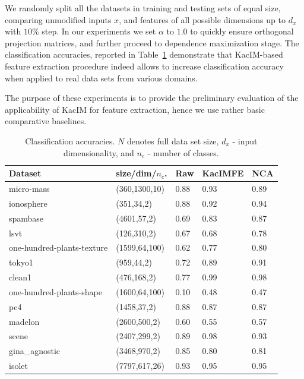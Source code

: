 \documentclass{article}
\begin{document}
We randomly split all the datasets in training and testing sets of equal size, comparing unmodified inputs $x$, and features of all possible dimensions up to $d_{x}$ with $10\%$ step.  In our experiments we set $\alpha$ to $1.0$ to quickly ensure orthogonal projection matrices, and further proceed to dependence maximization stage. 
The classification accuracies, reported in Table~\ref{table:classification_accuracies} demonstrate that KacIM-based feature extraction procedure indeed allows to increase classification accuracy when applied to real data sets from various domains.

The purpose of these experiments is to provide the preliminary evaluation of the applicability of KacIM for feature extraction, hence we use rather basic comparative baselines.


\begin{table}	
	\centering
	\begin{tabular}{ |p{3cm}|p{2.0cm}|p{1.2cm}|p{1.7cm}|p{1.2cm}|  }
		\hline
		Dataset & size/dim/$n_{c}$. & Raw & KacIMFE & NCA  \\
		\hline
		micro-mass  &  (360,1300,10)  &   0.88  &   0.93  &   0.89 \\
		ionosphere  &  (351,34,2)  &   0.88  &   0.92  &   0.94 \\
		spambase  &  (4601,57,2)  &   0.69  &   0.83  &   0.87 \\
		lsvt  &  (126,310,2)  &   0.67  &   0.68  &   0.78 \\		
		one-hundred-plants-texture  &  (1599,64,100)  &   0.62  &   0.77  &   0.80 \\
		tokyo1  &  (959,44,2)  &   0.72  &   0.89  &   0.91 \\				
		clean1  &  (476,168,2)  &   0.77  &   0.99  &   0.98 \\
		one-hundred-plants-shape  &  (1600,64,100)  &   0.10  &   0.48  &   0.47 \\	
		pc4  &  (1458,37,2)  &   0.88  &   0.87  &   0.87 \\
		madelon  &  (2600,500,2)  &   0.60  &   0.55  &   0.57 \\
		scene  &  (2407,299,2)  &   0.89  &   0.98  &   0.93 \\
		gina\_agnostic  &  (3468,970,2)  &   0.85  &   0.80  &   0.81 \\
		isolet  &  (7797,617,26)  &   0.93  &   0.95  &   0.95 \\			
								
		\hline
	\end{tabular}
	\caption{Classification accuracies. $N$ denotes full data set size, $d_{x}$ - input dimensionality, and $n_{c}$ - number of classes. }
	\label{table:classification_accuracies}	
\end{table}
\end{document}
